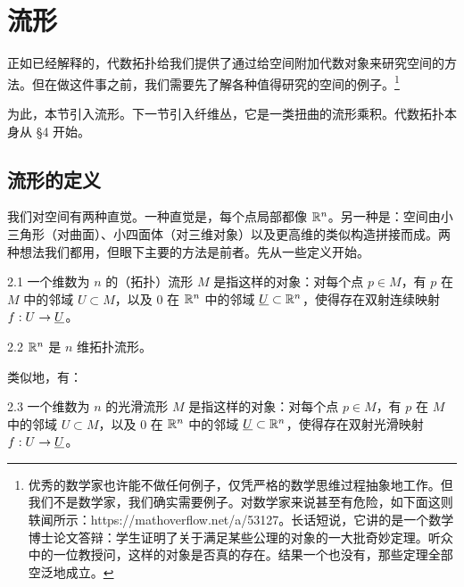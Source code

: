 \setcounter{footnote}{1}

\chapter{流形}
\setcounter{footnote}{2}
正如已经解释的，代数拓扑给我们提供了通过给空间附加代数对象来研究空间的方法。但在做这件事之前，我们需要先了解各种值得研究的空间的例子。\footnote{优秀的数学家也许能不做任何例子，仅凭严格的数学思维过程抽象地工作。但我们不是数学家，我们确实需要例子。对数学家来说甚至有危险，如下面这则轶闻所示：https://mathoverflow.net/a/53127。长话短说，它讲的是一个数学博士论文答辩：学生证明了关于满足某些公理的对象的一大批奇妙定理。听众中的一位教授问，这样的对象是否真的存在。结果一个也没有，那些定理全部空泛地成立。}

为此，本节引入流形。下一节引入纤维丛，它是一类扭曲的流形乘积。代数拓扑本身从 §4 开始。

\section{流形的定义}

我们对空间有两种直觉。一种直觉是，每个点局部都像 $\mathbb{R}^n$。另一种是：空间由小三角形（对曲面）、小四面体（对三维对象）以及更高维的类似构造拼接而成。两种想法我们都用，但眼下主要的方法是前者。先从一些定义开始。

\begin{definition}{2.1}
一个维数为 $n$ 的（拓扑）流形 $M$ 是指这样的对象：对每个点 $p\in M$，有 $p$ 在 $M$ 中的邻域 $U\subset M$，以及 $0$ 在 $\mathbb{R}^n$ 中的邻域 $\underline{U}\subset\mathbb{R}^n$，使得存在双射连续映射 $f:U\to\underline{U}$。
\end{definition}

\begin{example}{2.2}
$\mathbb{R}^n$ 是 $n$ 维拓扑流形。
\end{example}

类似地，有：

\begin{definition}{2.3}
一个维数为 $n$ 的光滑流形 $M$ 是指这样的对象：对每个点 $p\in M$，有 $p$ 在 $M$ 中的邻域 $U\subset M$，以及 $0$ 在 $\mathbb{R}^n$ 中的邻域 $\underline{U}\subset\mathbb{R}^n$，使得存在双射光滑映射 $f:U\to\underline{U}$。
\end{definition}


